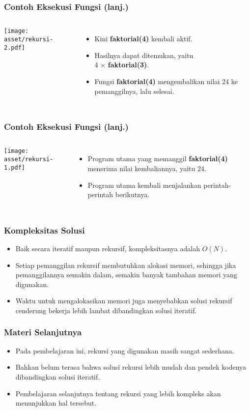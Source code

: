 \begin{frame}
\frametitle{Contoh Eksekusi Fungsi (lanj.)}
\begin{columns}
    \centering
    \texttt{[image: asset/rekursi-2.pdf]}
    \begin{itemize}
      \item Kini \textbf{faktorial(4)} kembali aktif.
      \item Hasilnya dapat ditemukan, yaitu \\ 4 $\times$ \textbf{faktorial(3)}.
      \item Fungsi \textbf{faktorial(4)} mengembalikan nilai 24 ke pemanggilnya, lalu selesai.
    \end{itemize}
  \end{columns} 
\end{frame}

\begin{frame}
\frametitle{Contoh Eksekusi Fungsi (lanj.)}
\begin{columns}
    \centering
    \texttt{[image: asset/rekursi-1.pdf]}
    \begin{itemize}
      \item Program utama yang memanggil \textbf{faktorial(4)} menerima nilai kembaliannya, yaitu 24.
      \item Program utama kembali menjalankan perintah-perintah berikutnya.
    \end{itemize}
  \end{columns} 
\end{frame}

\begin{frame}
\frametitle{Kompleksitas Solusi}
\begin{itemize}
  \item Baik secara iteratif maupun rekursif, kompleksitasnya adalah $O(N)$.
  \item Setiap pemanggilan rekursif membutuhkan alokasi memori, sehingga jika pemanggilannya semakin dalam, semakin banyak tambahan memori yang digunakan.
  \item Waktu untuk mengalokasikan memori juga menyebabkan solusi rekursif cenderung bekerja lebih lambat dibandingkan solusi iteratif.
\end{itemize}
\end{frame}

\begin{frame}
\frametitle{Materi Selanjutnya}
\begin{itemize}
  \item Pada pembelajaran ini, rekursi yang digunakan masih sangat sederhana.
  \item Bahkan belum terasa bahwa solusi rekursi lebih mudah dan pendek kodenya dibandingkan solusi iteratif.
  \item Pembelajaran selanjutnya tentang rekursi yang lebih kompleks akan menunjukkan hal tersebut.
\end{itemize}
\end{frame}


